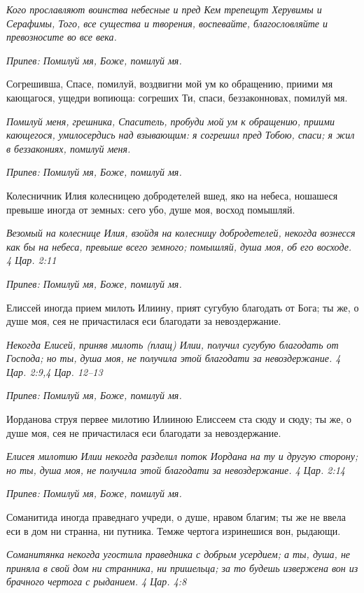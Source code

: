 \itshape Кого прославляют воинства небесные и пред Кем трепещут Херувимы и Серафимы, Того, все существа и творения, воспевайте, благословляйте и превозносите во все века.\normalfont{}


\itshape Припев:\normalfont{} Помилуй мя, Боже, помилуй мя.


Согрешивша, Спасе, помилуй, воздвигни мой ум ко обращению, приими мя кающагося, ущедри вопиюща: согреших Ти, спаси, беззаконновах, помилуй мя.


\itshape Помилуй меня, грешника, Спаситель, пробуди мой ум к обращению, приими кающегося, умилосердись над взывающим: я согрешил пред Тобою, спаси; я жил в беззакониях, помилуй меня.\normalfont{}


\itshape Припев:\normalfont{} Помилуй мя, Боже, помилуй мя.


Колесничник Илия колесницею добродетелей вшед, яко на небеса, ношашеся превыше иногда от земных: сего убо, душе моя, восход помышляй.


\itshape Везомый на колеснице Илия, взойдя на колесницу добродетелей, некогда вознесся как бы на небеса, превыше всего земного; помышляй, душа моя, об его восходе. 4 Цар. 2:11\normalfont{}


\itshape Припев:\normalfont{} Помилуй мя, Боже, помилуй мя.


Елиссей иногда прием милоть Илиину, прият сугубую благодать от Бога; ты же, о душе моя, сея не причастилася еси благодати за невоздержание.


\itshape Некогда Елисей, приняв милоть (плащ) Илии, получил сугубую благодать от Господа; но ты, душа моя, не получила этой благодати за невоздержание. 4 Цар. 2:9,4 Цар. 12–13\normalfont{}


\itshape Припев:\normalfont{} Помилуй мя, Боже, помилуй мя.


Иорданова струя первее милотию Илииною Елиссеем ста сюду и сюду; ты же, о душе моя, сея не причастилася еси благодати за невоздержание.


\itshape Елисея милотию Илии некогда разделил поток Иордана на ту и другую сторону; но ты, душа моя, не получила этой благодати за невоздержание. 4 Цар. 2:14\normalfont{}


\itshape Припев:\normalfont{} Помилуй мя, Боже, помилуй мя.


Соманитида иногда праведнаго учреди, о душе, нравом благим; ты же не ввела еси в дом ни странна, ни путника. Темже чертога изринешися вон, рыдающи.


\itshape Соманитянка некогда угостила праведника с добрым усердием; а ты, душа, не приняла в свой дом ни странника, ни пришельца; за то будешь извержена вон из брачного чертога с рыданием. 4 Цар. 4:8\normalfont{}


